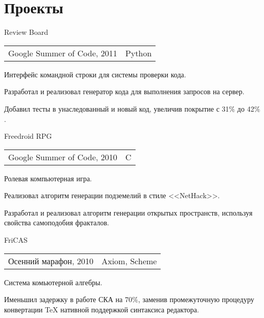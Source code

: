 \documentclass[a4paper]{article}
\begin{document}
	\section{Проекты}
	\begin{multicols}{2}
		\raggedcolumns
		\begin{project2}{Review Board}{\begin{tabular}{@{}l|l}Google Summer of Code, 2011 & Python\\\end{tabular}}
			Интерфейс командной строки для системы проверки кода.
			\begin{items}
				\item Разработал и реализовал генератор кода для выполнения запросов на сервер.
				\item Добавил тесты в  унаследованный и новый код, увеличив покрытие с 31$\%$ до 42$\%$.
			\end{items}
		\end{project2}

		\begin{project2}{Freedroid RPG}{\begin{tabular}{@{}l|l}Google Summer of Code, 2010 & C\\\end{tabular}}
			Ролевая компьютерная игра.
			\begin{items}
				\item Реализовал алгоритм генерации подземелий в стиле <<NetHack>>.
				\item Разработал и реализовал алгоритм генерации открытых пространств, используя свойства самоподобия фракталов.
			\end{items}
		\end{project2}

		\columnbreak

		\begin{project2}{FriCAS}{\begin{tabular}{@{}l|l}Осенний марафон, 2010 & Axiom, Scheme\\\end{tabular}}
			Система комьютерной алгебры.
			\begin{items}
				\item Именьшил задержку в работе СКА на 70$\%$, заменив промежуточную процедуру конвертации \TeX{} нативной поддержкой синтаксиса редактора.
			\end{items}
		\end{project2}


\end{multicols}
\end{document}
